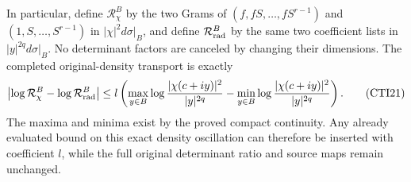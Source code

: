 In particular, define $\mathcal R_\chi^B$ by the two Grams of
$(f,fS,\ldots,fS^{r-1})$ and $(1,S,\ldots,S^{r-1})$ in
$|\chi|^2d\sigma|_B$, and define $\mathcal R_{\rm rad}^B$
by the same two coefficient lists in $|y|^{2q}d\sigma|_B$.
No determinant factors are canceled by changing their dimensions.
The completed original-density transport is exactly
\[
 \left|\log\mathcal R_\chi^B-
             \log\mathcal R_{\rm rad}^B\right|
 \leq l\left(
  \max_{y\in B}\log\frac{|\chi(c+iy)|^2}{|y|^{2q}}
 -\min_{y\in B}\log\frac{|\chi(c+iy)|^2}{|y|^{2q}}
 \right).
 \tag{CTI21}
\]
The maxima and minima exist by the proved compact continuity.
Any already evaluated bound on this exact density oscillation
can therefore be inserted with coefficient $l$, while the full
original determinant ratio and source maps remain unchanged.
